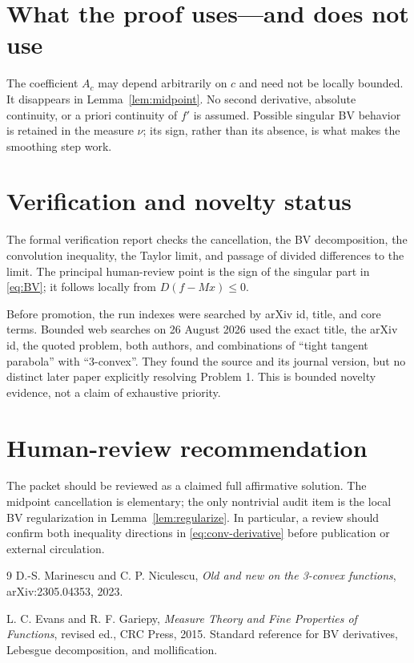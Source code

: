 \documentclass[10pt]{article}
\begin{document}
\section{What the proof uses---and does not use}

The coefficient $A_c$ may depend arbitrarily on $c$ and need not be locally
bounded.  It disappears in Lemma~\ref{lem:midpoint}.  No second derivative,
absolute continuity, or a priori continuity of $f'$ is assumed.  Possible
singular BV behavior is retained in the measure $\nu$; its sign, rather than
its absence, is what makes the smoothing step work.

\section{Verification and novelty status}

The formal verification report checks the cancellation, the BV decomposition,
the convolution inequality, the Taylor limit, and passage of divided
differences to the limit.  The principal human-review point is the sign of the
singular part in \eqref{eq:BV}; it follows locally from
$D(f-Mx)\le0$.

Before promotion, the run indexes were searched by arXiv id, title, and core
terms.  Bounded web searches on 26 August 2026 used the exact title, the arXiv
id, the quoted problem, both authors, and combinations of ``tight tangent
parabola'' with ``3-convex''.  They found the source and its journal version,
but no distinct later paper explicitly resolving Problem 1.  This is bounded
novelty evidence, not a claim of exhaustive priority.

\section{Human-review recommendation}

The packet should be reviewed as a claimed full affirmative solution.  The
midpoint cancellation is elementary; the only nontrivial audit item is the
local BV regularization in Lemma~\ref{lem:regularize}.  In particular, a review
should confirm both inequality directions in \eqref{eq:conv-derivative} before
publication or external circulation.

\begin{thebibliography}{9}
D.-S. Marinescu and C. P. Niculescu,
\emph{Old and new on the 3-convex functions},
arXiv:2305.04353, 2023.

L. C. Evans and R. F. Gariepy,
\emph{Measure Theory and Fine Properties of Functions}, revised ed.,
CRC Press, 2015.
Standard reference for BV derivatives, Lebesgue decomposition, and
mollification.
\end{thebibliography}
\end{document}
